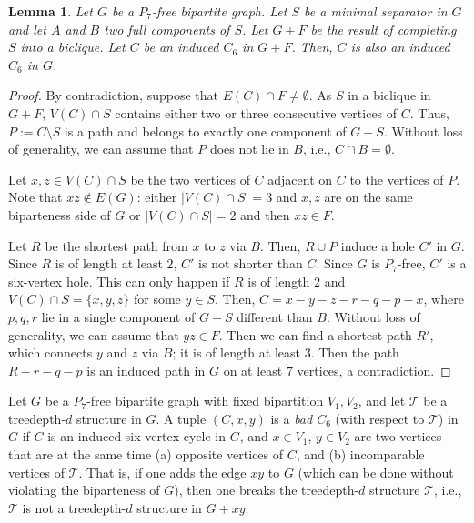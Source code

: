 \documentclass[11pt,a4paper]{article}
\newtheorem{lemma}[theorem]{Lemma}
\theoremstyle{definition}
\renewcommand{\varnothing}{\emptyset}
\def\T{\mathcal{T}}
\begin{document}
\begin{lemma}\label{lem:no_new_cycle}
    Let $G$ be a $P_7$-free bipartite graph. Let $S$ be a minimal separator in $G$
    and let $A$ and $B$ two full components of $S$.
    Let $G+F$ be the result of completing $S$ into a biclique. 
    Let $C$ be an induced $C_6$ in $G+F$. 
    Then, $C$ is also an induced $C_6$ in $G$.
\end{lemma}
\begin{proof}
By contradiction, suppose that $E(C)\cap F\neq \emptyset$. As $S$ in a biclique in $G+F$, $V(C)\cap S$ contains either two or three consecutive vertices of $C$.
Thus, $P := C \setminus S$ is a path and belongs to exactly one component of $G-S$.
Without loss of generality, we can assume that $P$ does not lie in $B$, i.e., $C \cap B=\varnothing$. 

Let $x,z \in V(C) \cap S$ be the two vertices of $C$ adjacent on $C$ to the vertices of $P$.
Note that $xz \notin E(G)$: either $|V(C) \cap S| = 3$ and $x,z$ are on the same biparteness
side of $G$ or $|V(C) \cap S| = 2$ and then $xz \in F$. 

Let $R$ be the shortest path from $x$ to $z$ via $B$. Then, $R \cup P$ induce a hole $C'$ in $G$.
Since $R$ is of length at least $2$, $C'$ is not shorter than $C$. Since $G$ is $P_7$-free,
$C'$ is a six-vertex hole. This can only happen if $R$ is of length $2$
and $V(C) \cap S = \{x,y,z\}$ for some $y \in S$.
Then, $C=x-y-z-r-q-p-x$, where $p, q,r$ lie in a single component of $G-S$ different than $B$. Without loss of generality, we can assume that $yz\in F$. Then we can find a shortest path $R'$, which connects $y$ and $z$ via $B$; it is of length at least $3$. Then the path $R-r-q-p$ is an induced path in $G$ on at least $7$ vertices, a contradiction.
\end{proof} 

Let $G$ be a $P_7$-free bipartite graph with fixed bipartition $V_1,V_2$, and let $\T$ be a treedepth-$d$ structure in $G$.
A tuple $(C,x,y)$ is a \emph{bad $C_6$} (with respect to $\T$) in $G$ if $C$ is an induced six-vertex cycle in $G$,
and $x \in V_1$, $y \in V_2$ are two vertices that are at the same time (a) opposite vertices of $C$, and (b)
incomparable vertices of $\T$.
That is, if one adds the edge $xy$ to $G$ (which can be done without violating the biparteness of $G$), then one breaks the treedepth-$d$ structure $\T$, i.e., $\T$ is not a treedepth-$d$ structure in $G + xy$.
\end{document}

